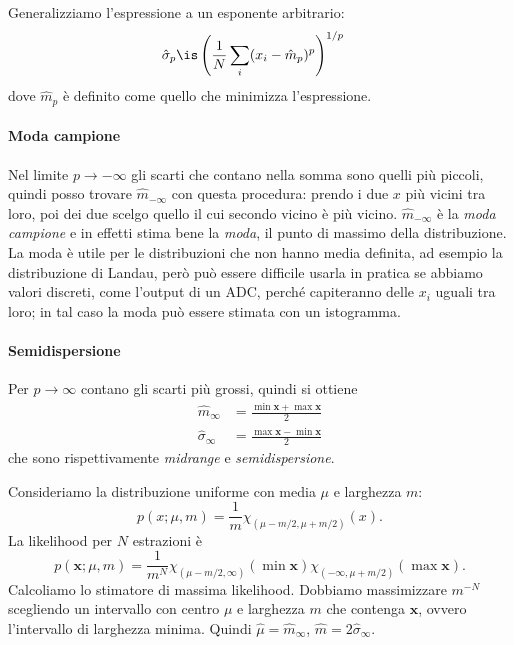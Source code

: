 Generalizziamo l'espressione a un esponente arbitrario:
\begin{align*}
	\hat\sigma_p
	&\is \left(\frac1N \sum_i (x_i - \hat m_p)^p\right)^{1/p}
\end{align*}
dove $\hat m_p$ è definito come quello che minimizza l'espressione.

\paragraph{Moda campione}

Nel limite $p\to-\infty$ gli scarti che contano nella somma sono quelli più
piccoli, quindi posso trovare $\hat m_{-\infty}$ con questa procedura: prendo i
due $x$ più vicini tra loro, poi dei due scelgo quello il cui secondo vicino è
più vicino. $\hat m_{-\infty}$ è la \emph{moda campione} e in effetti stima
bene la \emph{moda}, il punto di massimo della distribuzione. La moda è utile
per le distribuzioni che non hanno media definita, ad esempio la distribuzione
di Landau, però può essere difficile usarla in pratica se abbiamo valori
discreti, come l'output di un ADC, perché capiteranno delle $x_i$ uguali tra
loro; in tal caso la moda può essere stimata con un istogramma.

\paragraph{Semidispersione}

Per $p\to\infty$ contano gli scarti più grossi,
quindi si ottiene
\begin{align*}
	\hat m_\infty
	&= \frac{\min\mathbf x + \max\mathbf x}2 \\
	\hat\sigma_\infty
	&= \frac{\max\mathbf x - \min\mathbf x}2
\end{align*}
che sono rispettivamente \emph{midrange} e \emph{semidispersione}.
\begin{example}
	Consideriamo la distribuzione uniforme con media $\mu$ e larghezza $m$:
	\begin{equation*}
		p(x;\mu,m)
		= \frac1m \chi_{(\mu-m/2,\mu+m/2)}(x).
	\end{equation*}
	La likelihood per $N$ estrazioni è
	\begin{equation*}
		p(\mathbf x;\mu,m)
		= \frac1{m^N} \chi_{(\mu-m/2,\infty)}(\min\mathbf x) \chi_{(-\infty,\mu+m/2)}(\max\mathbf x).
	\end{equation*}
	Calcoliamo lo stimatore di massima likelihood.
	Dobbiamo massimizzare $m^{-N}$ scegliendo un intervallo con centro $\mu$ e larghezza $m$ che contenga $\mathbf x$,
	ovvero l'intervallo di larghezza minima.
	Quindi $\hat\mu=\hat m_\infty$, $\hat m=2\hat\sigma_\infty$.
\end{example}

